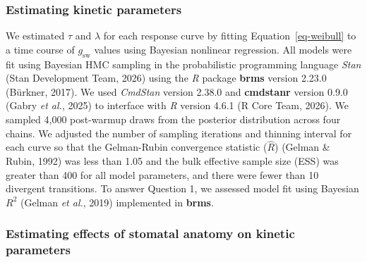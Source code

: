 \documentclass[
  letterpaper,
  DIV=11,
  numbers=noendperiod]{scrartcl}
\newcommand{\gsw}{$g_\mathrm{sw}$}
\begin{document}
\subsubsection{Estimating kinetic
parameters}\label{estimating-kinetic-parameters}

We estimated \(\tau\) and \(\lambda\) for each response curve by fitting
Equation~\ref{eq-weibull} to a time course of \gsw{} values using
Bayesian nonlinear regression. All models were fit using Bayesian HMC
sampling in the probabilistic programming language \emph{Stan} (Stan
Development Team, 2026) using the \emph{R} package \textbf{brms} version
2.23.0 (Bürkner, 2017). We used \emph{CmdStan} version 2.38.0 and
\textbf{cmdstanr} version 0.9.0 (Gabry \emph{et al.}, 2025) to interface
with \emph{R} version 4.6.1 (R Core Team, 2026). We sampled 4,000
post-warmup draws from the posterior distribution across four chains. We
adjusted the number of sampling iterations and thinning interval for
each curve so that the Gelman-Rubin convergence statistic (\(\hat{R}\))
(Gelman \& Rubin, 1992) was less than 1.05 and the bulk effective sample
size (ESS) was greater than 400 for all model parameters, and there were
fewer than 10 divergent transitions. To answer Question 1, we assessed
model fit using Bayesian \(R^2\) (Gelman \emph{et al.}, 2019)
implemented in \textbf{brms}.

\subsubsection{Estimating effects of stomatal anatomy on kinetic
parameters}\label{estimating-effects-of-stomatal-anatomy-on-kinetic-parameters}
\end{document}
